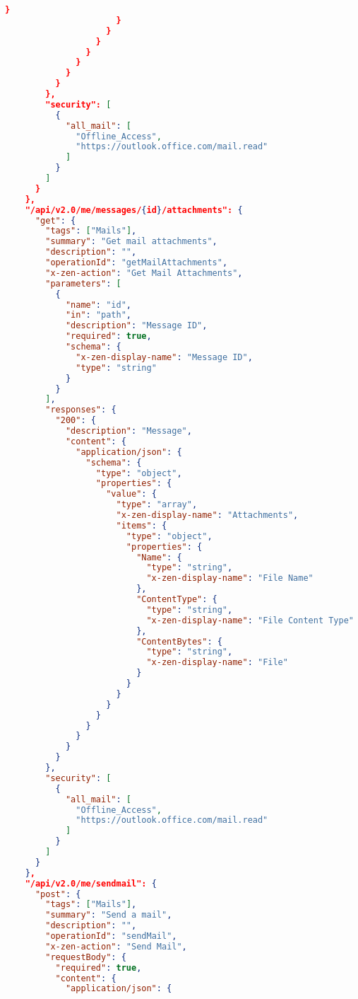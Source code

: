 \begin{lstlisting}[language=json,basicstyle=\ttfamily\tiny,numberstyle=\tiny]
                        }
                      }
                    }
                  }
                }
              }
            }
          }
        },
        "security": [
          {
            "all_mail": [
              "Offline_Access",
              "https://outlook.office.com/mail.read"
            ]
          }
        ]
      }
    },
    "/api/v2.0/me/messages/{id}/attachments": {
      "get": {
        "tags": ["Mails"],
        "summary": "Get mail attachments",
        "description": "",
        "operationId": "getMailAttachments",
        "x-zen-action": "Get Mail Attachments",
        "parameters": [
          {
            "name": "id",
            "in": "path",
            "description": "Message ID",
            "required": true,
            "schema": {
              "x-zen-display-name": "Message ID",
              "type": "string"
            }
          }
        ],
        "responses": {
          "200": {
            "description": "Message",
            "content": {
              "application/json": {
                "schema": {
                  "type": "object",
                  "properties": {
                    "value": {
                      "type": "array",
                      "x-zen-display-name": "Attachments",
                      "items": {
                        "type": "object",
                        "properties": {
                          "Name": {
                            "type": "string",
                            "x-zen-display-name": "File Name"
                          },
                          "ContentType": {
                            "type": "string",
                            "x-zen-display-name": "File Content Type"
                          },
                          "ContentBytes": {
                            "type": "string",
                            "x-zen-display-name": "File"
                          }
                        }
                      }
                    }
                  }
                }
              }
            }
          }
        },
        "security": [
          {
            "all_mail": [
              "Offline_Access",
              "https://outlook.office.com/mail.read"
            ]
          }
        ]
      }
    },
    "/api/v2.0/me/sendmail": {
      "post": {
        "tags": ["Mails"],
        "summary": "Send a mail",
        "description": "",
        "operationId": "sendMail",
        "x-zen-action": "Send Mail",
        "requestBody": {
          "required": true,
          "content": {
            "application/json": {

\end{lstlisting}
